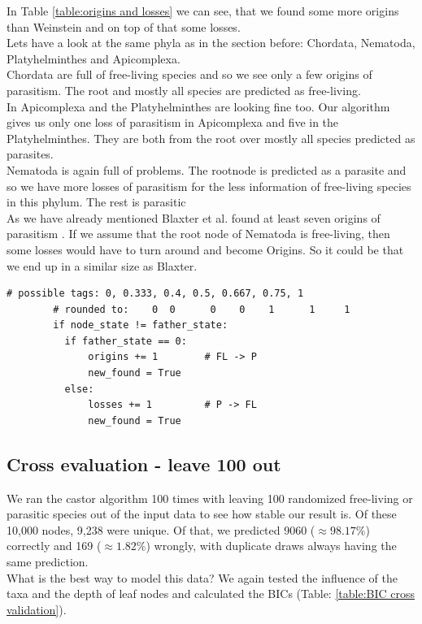       In Table \ref{table:origins and losses} we can see, that we found some more origins than Weinstein 
        and on top of that some losses. \\
      
      Lets have a look at the same phyla as in the section before: Chordata, Nematoda, 
        Platyhelminthes and Apicomplexa. \\
      Chordata are full of free-living species and so we see only a few origins of parasitism. The root
      and mostly all species are predicted as free-living. \\
      In Apicomplexa and the Platyhelminthes are looking fine too. Our algorithm gives us only one loss 
        of parasitism in Apicomplexa and five in the Platyhelminthes. They are both from the root over 
        mostly all species predicted as parasites. \\
      Nematoda is again full of problems. The rootnode is predicted as a parasite and so we have more 
        losses of parasitism for the less information of free-living species in this phylum. The rest 
        is parasitic \\
        As we have already mentioned Blaxter et al. found at least seven origins of parasitism 
          \cite{Blaxter1998}. If we assume that the root node of Nematoda is free-living, then some 
          losses would have to turn around and become Origins. So it could be that we end up in a similar 
          size as Blaxter.

      \begin{lstlisting}[gobble=6]
        # possible tags: 0, 0.333, 0.4, 0.5, 0.667, 0.75, 1
        # rounded to:    0  0      0    0    1      1     1
        if node_state != father_state:
          if father_state == 0:
              origins += 1        # FL -> P
              new_found = True
          else:
              losses += 1         # P -> FL
              new_found = True
      \end{lstlisting}

      
    \subsection{Cross evaluation - leave 100 out}
      We ran the castor algorithm 100 times with leaving 100 randomized free-living or parasitic species 
        out of the input data to see how stable our result is. Of these 10,000 nodes, 9,238 were unique. 
        Of that, we predicted 9060 ($\approx 98.17\%$) correctly and 169 ($\approx 1.82\%$) wrongly, with 
        duplicate draws always having the same prediction. \\
      What is the best way to model this data? We again tested the influence of the taxa and the depth of 
        leaf nodes and calculated the BICs (Table: \ref{table:BIC cross validation}).

